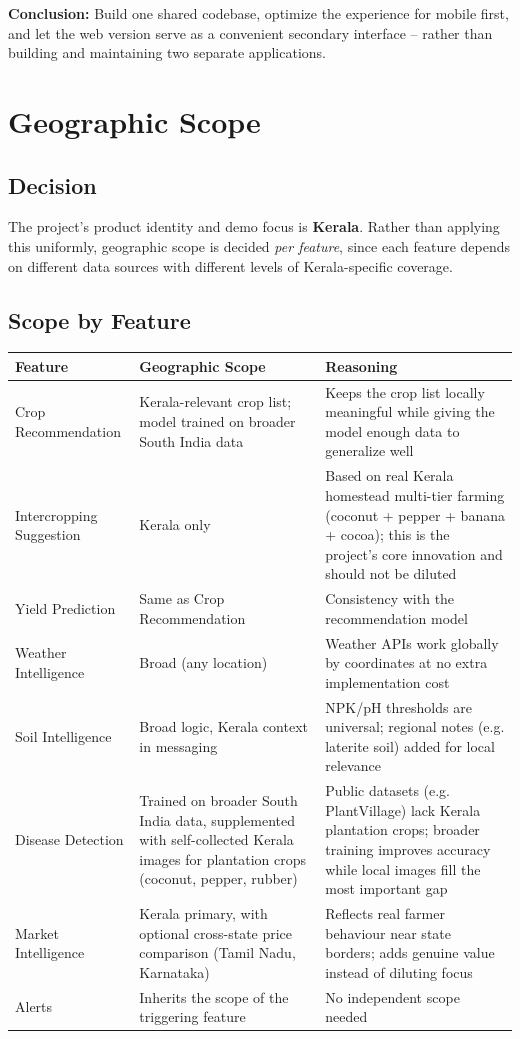 \documentclass[12pt,a4paper]{article}
\begin{document}
\textbf{Conclusion:} Build one shared codebase, optimize the experience for mobile first, and let the web version serve as a convenient secondary interface -- rather than building and maintaining two separate applications.

\section{Geographic Scope}

\subsection{Decision}
The project's product identity and demo focus is \textbf{Kerala}. Rather than applying this uniformly, geographic scope is decided \textit{per feature}, since each feature depends on different data sources with different levels of Kerala-specific coverage.

\subsection{Scope by Feature}
\begin{longtable}{p{3.4cm} p{4.6cm} p{5.4cm}}
\toprule
\textbf{Feature} & \textbf{Geographic Scope} & \textbf{Reasoning} \\
\midrule
\endhead
Crop Recommendation & Kerala-relevant crop list; model trained on broader South India data & Keeps the crop list locally meaningful while giving the model enough data to generalize well \\
Intercropping Suggestion & Kerala only & Based on real Kerala homestead multi-tier farming (coconut + pepper + banana + cocoa); this is the project's core innovation and should not be diluted \\
Yield Prediction & Same as Crop Recommendation & Consistency with the recommendation model \\
Weather Intelligence & Broad (any location) & Weather APIs work globally by coordinates at no extra implementation cost \\
Soil Intelligence & Broad logic, Kerala context in messaging & NPK/pH thresholds are universal; regional notes (e.g. laterite soil) added for local relevance \\
Disease Detection & Trained on broader South India data, supplemented with self-collected Kerala images for plantation crops (coconut, pepper, rubber) & Public datasets (e.g. PlantVillage) lack Kerala plantation crops; broader training improves accuracy while local images fill the most important gap \\
Market Intelligence & Kerala primary, with optional cross-state price comparison (Tamil Nadu, Karnataka) & Reflects real farmer behaviour near state borders; adds genuine value instead of diluting focus \\
Alerts & Inherits the scope of the triggering feature & No independent scope needed \\
\bottomrule
\end{longtable}
\end{document}
